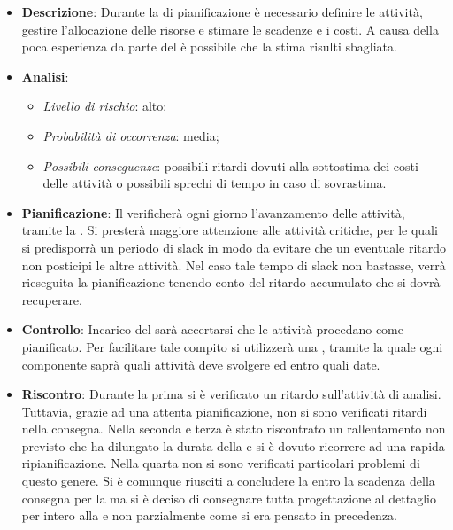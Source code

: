 			\begin{itemize}
				\item \textbf{Descrizione}: Durante la  di pianificazione è necessario definire le attività, gestire l'allocazione delle risorse e stimare le scadenze e i costi. A causa della poca esperienza da parte del  è possibile che la stima risulti sbagliata.
				\item \textbf{Analisi}:
				\begin{itemize}
					\item \textit{Livello di rischio}: alto;
					\item \textit{Probabilità di occorrenza}: media;
					\item \textit{Possibili conseguenze}: possibili ritardi dovuti alla sottostima dei costi delle attività o possibili sprechi di tempo in caso di sovrastima. 
				\end{itemize}
				\item \textbf{Pianificazione}: Il  verificherà ogni giorno l'avanzamento delle attività, tramite la \textit{}. Si presterà maggiore attenzione alle attività critiche, per le quali si predisporrà un periodo di slack in modo da evitare che un eventuale ritardo non posticipi le altre attività. Nel caso tale tempo di slack non bastasse, verrà rieseguita la pianificazione tenendo conto del ritardo accumulato che si dovrà recuperare.
				\item \textbf{Controllo}: Incarico del  sarà accertarsi che le attività procedano come pianificato. Per facilitare tale compito si utilizzerà una \textit{}, tramite la quale ogni componente saprà quali attività deve svolgere ed entro quali date.
				\item \textbf{Riscontro}: Durante la prima  si è verificato un ritardo sull’attività di analisi. Tuttavia, grazie ad una attenta pianificazione, non si sono verificati ritardi nella consegna. Nella seconda e terza  è stato riscontrato un rallentamento non previsto che ha dilungato la durata della  e si è dovuto ricorrere ad una rapida ripianificazione. Nella quarta  non si sono verificati particolari problemi di questo genere. Si è comunque riusciti a concludere la  entro la scadenza della consegna per la  ma si è deciso di consegnare tutta progettazione al dettaglio per intero alla  e non parzialmente come si era pensato in precedenza.
			\end{itemize}
